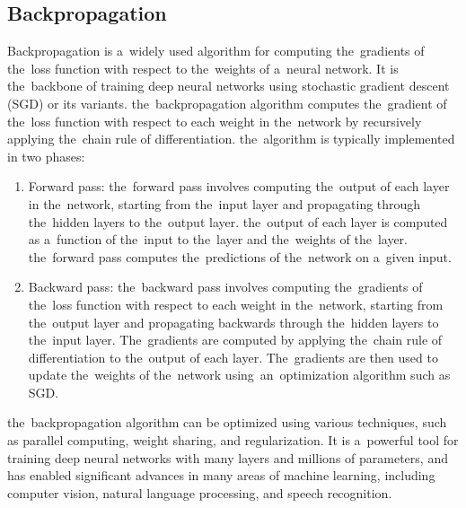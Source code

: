         \subsection{Backpropagation}\label{subsec:backpropagation}
        Backpropagation is a~widely used algorithm for computing the~gradients of the~loss function with
        respect to the~weights of a~neural network. It is the~backbone of training deep neural networks using
        stochastic gradient descent (SGD) or its variants.
        the~backpropagation algorithm computes the~gradient of the~loss function with respect to each
        weight in the~network by recursively applying the~chain rule of differentiation.
        the~algorithm is typically implemented in two phases:
        \begin{enumerate}
            \item Forward pass: the~forward pass involves computing the~output of each layer in the~network,
            starting from the~input layer and propagating through the~hidden layers to the~output layer.
            the~output of each layer is computed as a~function of the~input to the~layer and the~weights of the~layer.
            the~forward pass computes the~predictions of the~network on a~given input.
            \item Backward pass: the~backward pass involves computing the~gradients of the~loss function with
            respect to each weight in the~network, starting from the~output layer and propagating backwards
            through the~hidden layers to the~input layer. The~gradients are computed by applying the~chain rule of
            differentiation to the~output of each layer. The~gradients are then used to update the~weights of
            the~network using~an~optimization algorithm such as SGD.
        \end{enumerate}
        the~backpropagation algorithm can be optimized using various techniques, such as parallel computing, weight
        sharing, and regularization. It is a~powerful tool for training deep neural networks with many layers and
        millions of parameters, and has enabled significant advances in many areas of machine learning, including
        computer vision, natural language processing, and speech recognition.

